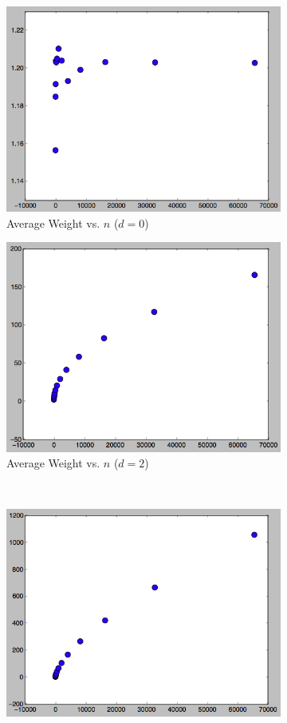 \documentclass[12pt]{article}
\begin{document}
\begin{figure}
\centering
\begin{subfigure}{.5\textwidth}
  \centering
  \includegraphics[width=0.8\linewidth]{img/result0.png}
  \caption{Average Weight vs. $n$ ($d = 0$)}
  \label{fig:sub1}
\end{subfigure}%
\begin{subfigure}{.5\textwidth}
  \centering
  \includegraphics[width=0.8\linewidth]{img/result2.png}
  \caption{Average Weight vs. $n$ ($d = 2$)}
  \label{fig:sub2}
\end{subfigure} \\ %
\bigskip
\begin{subfigure}{.5\textwidth}
  \centering
  \includegraphics[width=0.8\linewidth]{img/result3.png}

\end{subfigure}
\end{figure}
\end{document}
